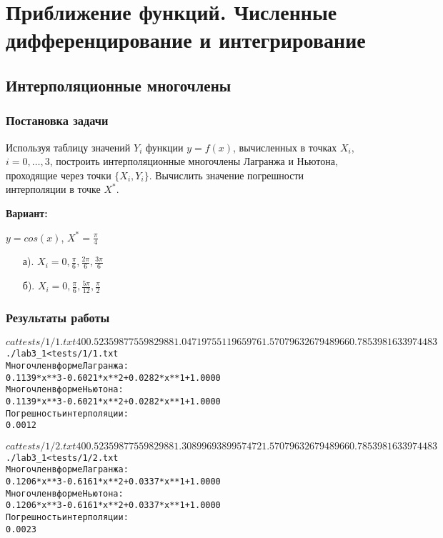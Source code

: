 \section{Приближение функций. Численные дифференцирование и интегрирование}

\subsection{Интерполяционные многочлены}

\subsubsection{Постановка задачи}
Используя таблицу значений $Y_i$ функции $y = f(x)$, вычисленных в точках $X_i$, $i = 0, \ldots, 3$, построить интерполяционные многочлены Лагранжа и Ньютона, проходящие через точки $\{X_i, Y_i\}$. Вычислить значение погрешности интерполяции в точке $X^*$.

{\bfseries Вариант:}

$y = cos(x)$, $X^* = \frac{\pi}{4}$

\begin{enumerate}
	\item[а).] $X_i = 0, \frac{\pi}{6}, \frac{2\pi}{6}, \frac{3\pi}{6}$
	\item[б).] $X_i = 0, \frac{\pi}{6}, \frac{5\pi}{12}, \frac{\pi}{2}$
\end{enumerate}

\subsubsection{Результаты работы}
\begin{alltt}
$ cat tests/1/1.txt
4
0 0.5235987755982988 1.0471975511965976 1.5707963267948966
0.7853981633974483

$ ./lab3_1 < tests/1/1.txt
Многочлен в форме Лагранжа:
0.1139 * x**3 - 0.6021 * x**2 + 0.0282 * x**1 + 1.0000
Многочлен в форме Ньютона:
0.1139 * x**3 - 0.6021 * x**2 + 0.0282 * x**1 + 1.0000
Погрешность интерполяции:
0.0012
\end{alltt}

\begin{alltt}
$ cat tests/1/2.txt
4
0 0.5235987755982988 1.3089969389957472 1.5707963267948966
0.7853981633974483

$ ./lab3_1 < tests/1/2.txt
Многочлен в форме Лагранжа:
0.1206 * x**3 - 0.6161 * x**2 + 0.0337 * x**1 + 1.0000
Многочлен в форме Ньютона:
0.1206 * x**3 - 0.6161 * x**2 + 0.0337 * x**1 + 1.0000
Погрешность интерполяции:
0.0023
\end{alltt}

